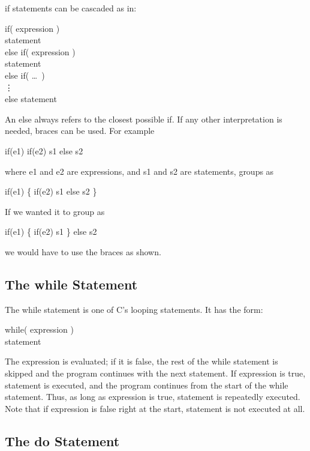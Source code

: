    {\cd if} statements can be  cascaded as in:
\begin{code}
if( {\ms expression\/} )		\\
 \> {\ms statement\/}			\\
else if( {\ms expression\/} ) \\
 \> {\ms statement\/}			\\
else if( \ldots\  ) \\
 \vdots							\\
else {\ms statement\/}
\end{code}
\noindent
     An  {\cd else}  always  refers  to  the  closest  possible  {\cd
if}.  If  any  other interpretation is needed, braces can be used.
For example
\begin{code}
if({\ms e1\/}) if({\ms e2\/}) {\ms s1\/} else {\ms s2\/}
\end{code}
\noindent
     where {\ms e1\/} and {\ms e2\/} are expressions, and {\ms s1\/} and
{\ms s2\/} are statements, groups as
\begin{code}
if({\ms e1\/}) \{ if({\ms e2\/}) {\ms s1\/} else {\ms s2\/} \}
\end{code}
\noindent
     If we wanted it to group as
\begin{code}
if({\ms e1\/}) \{ if({\ms e2\/}) {\ms s1\/} \} else {\ms s2\/}
\end{code}
\noindent
     we would have to use the braces as shown.



\subsection{The {\cd while} Statement}
\label{while_st}
     The {\cd while} statement is one of C's looping statements. It has
the form:
\begin{code}
while( {\ms expression\/} ) \\
\> {\ms statement\/}
\end{code}
\noindent
     The {\ms expression\/}  is evaluated; if it  is false,  the
rest of the {\cd while} statement is skipped and  the program
continues with the next statement. If {\ms expression\/} is true, 
{\ms statement\/} is  executed, and  the program continues from the
start of the while statement. Thus, as long as {\ms expression\/} is
true,  {\ms statement\/} is repeatedly executed. Note that  if {\ms
expression\/} is false right  at  the start, {\ms statement\/} is not
executed at all.


\subsection{The {\cd do} Statement}

